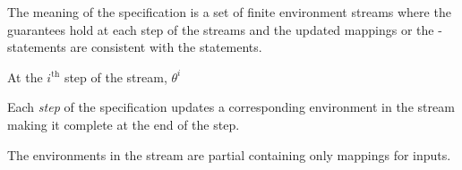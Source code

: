The meaning of the specification is a set of finite environment streams where the guarantees hold at each step of the streams and the updated mappings or the -statements are consistent with the statements.


At the $i^\mathrm{th}$ step of the stream, $\theta^i$


Each \emph{step} of the specification updates a corresponding environment in the stream making it complete at the end of the step.  

The environments in the stream are partial containing only mappings for inputs.

\begin{comment}
  A \emph{system} is a collection of \emph{components}, \emph{connections} between components, a \emph{scheduler} to order execution, and a \emph{system environment} for primary inputs. The computation for the component in this work is defined entirely by a step function:
\[
\konst{stepFn} : \mathit{inports} \times \mathit{stateVars} \to \mathit{stateVars}
\]
The scheduler \emph{activates} components in some order. Activating a component is defined as follows: 
\[
\begin{array}{ll}
 \mathit{inportVals} & = \konst{readInputs}(); \\
 (v_1,\ldots,v_k) & = \konst{readState}() ; \\
 ({v_1}',\ldots,{v_k}') & = \konst{stepFn} (\mathit{inportVals},\mathit{stateVars}) ; \\
 \multicolumn{2}{l}{\konst{writeState}({v_1}',\ldots,{v_k}');} \\
 \multicolumn{2}{l}{\konst{writeOutputs}({v_1}',\ldots,{v_k}');} \\
\end{array}
\]
It is assumed that the scheduler follows some sensible partial order of component activation and allows each component sufficient time for its computation.
\end{comment}